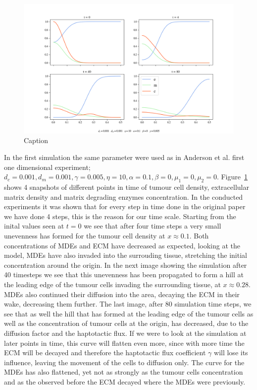 \begin{figure}[t]
    \centering
    \includegraphics[width=\textwidth]{resources/images/2D_1e-3_1e-3_1e-3_10_0.1_0_0.005_1e-2_10_plot.png}
    \caption{Caption}
    \label{fig:2D_1e-3_1e-3_1e-3_10_0.1_0_0.005}
\end{figure}
In the first simulation the same parameter were used as in Anderson et al. first one dimensional experiment; $d_c = 0.001, d_m = 0.001, \gamma = 0.005, \eta = 10, \alpha = 0.1, \beta = 0, \mu_1 = 0, \mu_2 = 0$. Figure~\ref{fig:2D_1e-3_1e-3_1e-3_10_0.1_0_0.005} shows 4 snapshots of different points in time of tumour cell density, extracellular matrix density and matrix degrading enzymes concentration. In the conducted experiments it was shown that for every step in time done in the original paper we have done 4 steps, this is the reason for our time scale. Starting from the inital values seen at $t=0$ we see that after four time steps a very small unevenness has formed for the tumour cell density at $x\approx 0.1$. Both concentrations of MDEs and ECM have decreased as expected, looking at the model, MDEs have also invaded into the surrouding tissue, stretching the initial concentration around the origin.
In the next image showing the simulation after 40 timesteps we see that this unevenness has been propagated to form a hill at the leading edge of the tumour cells invading the surrounding tissue, at $x\approx 0.28$. MDEs also continued their diffusion into the area, decaying the ECM in their wake, decreasing them further. 
The last image, after 80 simulation time steps, we see that as well the hill that has formed at the leading edge of the tumour cells as well as the concentration of tumour cells at the origin, has decreased, due to the diffusion factor and the haptotactic flux. If we were to look at the simulation at later points in time, this curve will flatten even more, since with more time the ECM will be decayed and therefore the haptotactic flux coefficient $\gamma$ will lose its influence, leaving the movement of the cells to diffusion only. The curve for the MDEs has also flattened, yet not as strongly as the tumour cells concentration and as the observed before the ECM decayed where the MDEs were previously.\newline
